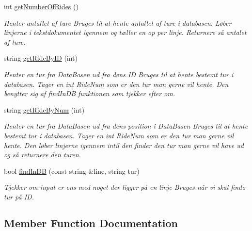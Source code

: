 \begin{DoxyCompactItemize}
\mbox{\label{classDataBase_acbbb2aaff1e6a78f5e61a77ea1257057}} 
int \hyperlink{classDataBase_acbbb2aaff1e6a78f5e61a77ea1257057}{get\+Number\+Of\+Rides} ()
\begin{DoxyCompactList}\small\item\em Henter antallet af ture Bruges til at hente antallet af ture i databasen. Løber linjerne i tekstdokumentet igennem og tæller en op per linje. Returnere så antalet af ture. \end{DoxyCompactList}\item 
string \hyperlink{classDataBase_afc5c8eb0a4af1217df3c0590550f4854}{get\+Ride\+By\+ID} (int)
\begin{DoxyCompactList}\small\item\em Henter en tur fra Data\+Basen ud fra dens ID Bruges til at hente bestemt tur i databasen. Tager en int Ride\+Num som er den tur man gerne vil hente. Den benytter sig af find\+In\+DB funktionen som tjekker efter om. \end{DoxyCompactList}\item 
string \hyperlink{classDataBase_af54cca48be1b450a8b9bf9cc0267b2e1}{get\+Ride\+By\+Num} (int)
\begin{DoxyCompactList}\small\item\em Henter en tur fra Data\+Basen ud fra dens position i Data\+Basen Bruges til at hente bestemt tur i databasen. Tager en int Ride\+Num som er den tur man gerne vil hente. Den løber linjerne igennem intil den finder den tur man gerne vil have ud og så returnere den turen. \end{DoxyCompactList}\item 
bool \hyperlink{classDataBase_a90b58b8a905fb9a66eea7a2e74f6c207}{find\+In\+DB} (const string \&line, string tur)
\begin{DoxyCompactList}\small\item\em Tjekker om input er ens med noget der ligger på en linje Bruges når vi skal finde tur på ID. \end{DoxyCompactList}\end{DoxyCompactItemize}


\subsection{Member Function Documentation}
\mbox{\label{classDataBase_a66af12bc7cb83beb4d8720786f2c6093}} 
